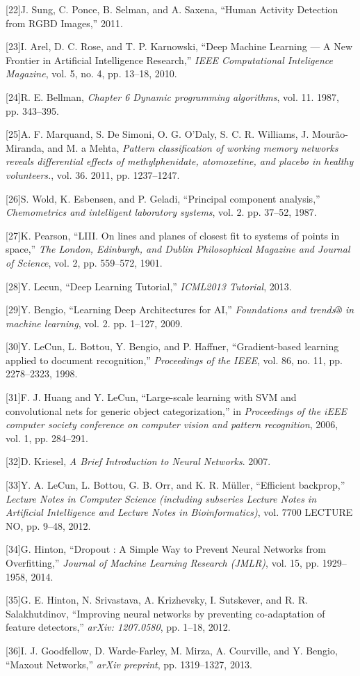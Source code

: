 {[}22{]}J. Sung, C. Ponce, B. Selman, and A. Saxena, ``Human Activity
Detection from RGBD Images,'' 2011.

{[}23{]}I. Arel, D. C. Rose, and T. P. Karnowski, ``Deep Machine
Learning --- A New Frontier in Artificial Intelligence Research,''
\emph{IEEE Computational Inteligence Magazine}, vol. 5, no. 4, pp.
13--18, 2010.

{[}24{]}R. E. Bellman, \emph{Chapter 6 Dynamic programming algorithms},
vol. 11. 1987, pp. 343--395.

{[}25{]}A. F. Marquand, S. {De Simoni}, O. G. O'Daly, S. C. R. Williams,
J. Mourão-Miranda, and M. a Mehta, \emph{Pattern classification of
working memory networks reveals differential effects of methylphenidate,
atomoxetine, and placebo in healthy volunteers.}, vol. 36. 2011, pp.
1237--1247.

{[}26{]}S. Wold, K. Esbensen, and P. Geladi, ``Principal component
analysis,'' \emph{Chemometrics and intelligent laboratory systems}, vol.
2. pp. 37--52, 1987.

{[}27{]}K. Pearson, ``LIII. On lines and planes of closest fit to
systems of points in space,'' \emph{The London, Edinburgh, and Dublin
Philosophical Magazine and Journal of Science}, vol. 2, pp. 559--572,
1901.

{[}28{]}Y. Lecun, ``Deep Learning Tutorial,'' \emph{ICML2013 Tutorial},
2013.

{[}29{]}Y. Bengio, ``Learning Deep Architectures for AI,''
\emph{Foundations and trends® in machine learning}, vol. 2. pp. 1--127,
2009.

{[}30{]}Y. LeCun, L. Bottou, Y. Bengio, and P. Haffner, ``Gradient-based
learning applied to document recognition,'' \emph{Proceedings of the
IEEE}, vol. 86, no. 11, pp. 2278--2323, 1998.

{[}31{]}F. J. Huang and Y. LeCun, ``Large-scale learning with SVM and
convolutional nets for generic object categorization,'' in
\emph{Proceedings of the iEEE computer society conference on computer
vision and pattern recognition}, 2006, vol. 1, pp. 284--291.

{[}32{]}D. Kriesel, \emph{A Brief Introduction to Neural Networks}.
2007.

{[}33{]}Y. A. LeCun, L. Bottou, G. B. Orr, and K. R. Müller, ``Efficient
backprop,'' \emph{Lecture Notes in Computer Science (including subseries
Lecture Notes in Artificial Intelligence and Lecture Notes in
Bioinformatics)}, vol. 7700 LECTURE NO, pp. 9--48, 2012.

{[}34{]}G. Hinton, ``Dropout : A Simple Way to Prevent Neural Networks
from Overfitting,'' \emph{Journal of Machine Learning Research (JMLR)},
vol. 15, pp. 1929--1958, 2014.

{[}35{]}G. E. Hinton, N. Srivastava, A. Krizhevsky, I. Sutskever, and R.
R. Salakhutdinov, ``Improving neural networks by preventing
co-adaptation of feature detectors,'' \emph{arXiv: 1207.0580}, pp.
1--18, 2012.

{[}36{]}I. J. Goodfellow, D. Warde-Farley, M. Mirza, A. Courville, and
Y. Bengio, ``Maxout Networks,'' \emph{arXiv preprint}, pp. 1319--1327,
2013.
